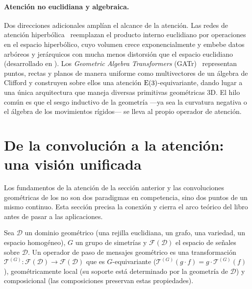 \paragraph{Atenci\'on no euclidiana y algebraica.}
Dos direcciones adicionales ampl\'ian el alcance de la atenci\'on. Las redes de
atenci\'on hiperb\'olica~\citep{gulcehre2019hyperbolic} reemplazan el producto
interno euclidiano por operaciones en el espacio hiperb\'olico, cuyo volumen
crece exponencialmente y embebe datos arb\'oreos y jer\'arquicos con mucha menos
distorsi\'on que el espacio euclidiano (desarrollado en ). Los
\emph{Geometric Algebra Transformers} (GATr)~\citep{brehmer2023geometric}
representan puntos, rectas y planos de manera uniforme como multivectores de un
\'algebra de Clifford y construyen sobre ellos una atenci\'on
$\mathrm{E}(3)$-equivariante, dando lugar a una \'unica arquitectura que maneja
diversas primitivas geom\'etricas 3D. El hilo com\'un es que el sesgo inductivo
de la geometr\'ia ---ya sea la curvatura negativa o el \'algebra de los
movimientos r\'igidos--- se lleva al propio operador de atenci\'on.

\section{De la convoluci\'on a la atenci\'on: una visi\'on unificada}
\label{sec:apps:cnn-attention}

Los fundamentos de la atenci\'on de la secci\'on anterior y las convoluciones
geom\'etricas de los  no son dos paradigmas
en competencia, sino dos puntos de un mismo continuo. Esta secci\'on precisa la
conexi\'on y cierra el arco te\'orico del libro antes de pasar a las
aplicaciones.

\begin{definition}
\label{def:apps:geom-mp}
Sea $\mathcal{D}$ un dominio geom\'etrico (una rejilla euclidiana, un grafo, una
variedad, un espacio homog\'eneo), $G$ un grupo de simetr\'ias y
$\mathcal{F}(\mathcal{D})$ el espacio de se\~nales sobre $\mathcal{D}$. Un
operador de paso de mensajes geom\'etrico es una transformaci\'on
$\mathcal{T}^{(G)}:\mathcal{F}(\mathcal{D})\to\mathcal{F}(\mathcal{D})$ que es
$G$-equivariante ($\mathcal{T}^{(G)}(g\cdot f) = g\cdot\mathcal{T}^{(G)}(f)$),
geom\'etricamente local (su soporte est\'a determinado por la geometr\'ia de
$\mathcal{D}$) y composicional (las composiciones preservan estas propiedades).
\end{definition}

